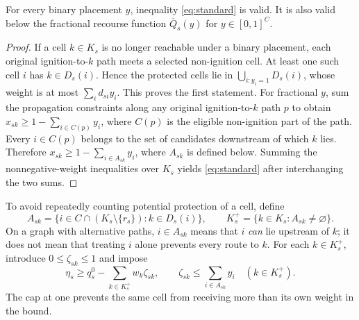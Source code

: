 \begin{proposition}
\label{prop:standard}
For every binary placement $y$, inequality \eqref{eq:standard} is valid.
It is also valid below the fractional recourse function
$\overline Q_s(y)$ for $y\in[0,1]^C$.
\end{proposition}
\begin{proof}
If a cell $k\in K_s$ is no longer reachable under a binary placement,
each original ignition-to-$k$ path meets a selected non-ignition cell.
At least one such cell $i$ has $k\in D_s(i)$. Hence the protected cells
lie in $\bigcup_{i:y_i=1}D_s(i)$, whose weight is at most
$\sum_i d_{si}y_i$. This proves the first statement.
For fractional $y$, sum the propagation constraints along any original
ignition-to-$k$ path $p$ to obtain
$x_{sk}\ge 1-\sum_{i\in C(p)}y_i$, where $C(p)$ is the eligible
non-ignition part of the path. Every $i\in C(p)$ belongs to the set of
candidates downstream of which $k$ lies. Therefore
$x_{sk}\ge 1-\sum_{i\in A_{sk}}y_i$, where $A_{sk}$ is defined below.
Summing the nonnegative-weight inequalities over $K_s$ yields
\eqref{eq:standard} after interchanging the two sums.
\end{proof}

To avoid repeatedly counting potential protection of a cell, define
\begin{equation}\label{eq:coverage-sets}
 A_{sk}=\{i\in C\cap(K_s\setminus\{r_s\}): k\in D_s(i)\},
 \qquad K_s^+=\{k\in K_s:A_{sk}\ne\varnothing\}.
\end{equation}
On a graph with alternative paths, $i\in A_{sk}$ means that $i$ \emph{can}
lie upstream of $k$; it does not mean that treating $i$ alone prevents
every route to $k$. For each $k\in K_s^+$, introduce
$0\le\zeta_{sk}\le1$ and impose
\begin{equation}\label{eq:coverage-ext}
 \eta_s\ge q_s^0-\sum_{k\in K_s^+}w_k\zeta_{sk},
 \qquad
 \zeta_{sk}\le\sum_{i\in A_{sk}}y_i\quad(k\in K_s^+).
\end{equation}
The cap at one prevents the same cell from receiving more than its own
weight in the bound.

